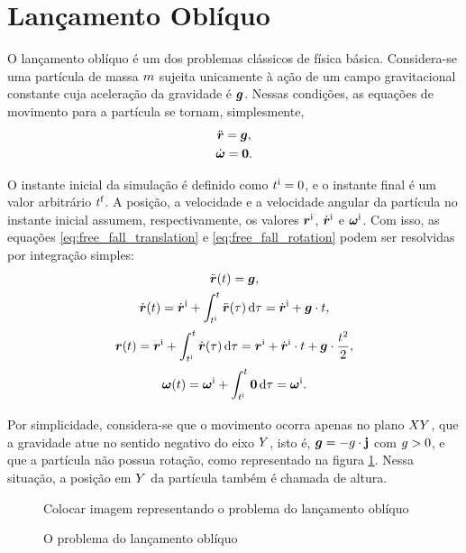 \section{Lançamento Oblíquo}

O lançamento oblíquo é um dos problemas clássicos de física básica. Considera-se uma partícula de massa \(m\) sujeita unicamente à ação de um campo gravitacional constante cuja aceleração da gravidade é \(\bm{g}\). Nessas condições, as equações de movimento para a partícula se tornam, simplesmente,
\begin{gather}
	\acceleration = \gravity, \label{eq:free_fall_translation}\\
	\angularAcceleration = \nullVector \label{eq:free_fall_rotation}.
\end{gather}

O instante inicial da simulação é definido como \(t_{}^{\text{i}}=0\), e o instante final é um valor arbitrário \(t_{}^{\text{f}}\). A posição, a velocidade e a velocidade angular da partícula no instante inicial assumem, respectivamente, os valores \(\bm{r}^{\text{i}}\), \(\initial{\velocity}\) e \(\bm{\omega}^{\text{i}}\). Com isso, as equações \eqref{eq:free_fall_translation} e \eqref{eq:free_fall_rotation} podem ser resolvidas por integração simples:
\begin{gather*}
	\acceleration\pqty{t} = \gravity, \\
	\velocity\pqty{t} = \initial{\velocity} + \int_{\initialInstant}^{t} \acceleration\pqty{\tau} \dd{\tau} = \initial{\velocity} + \gravity\cdot t, \\
	\position\pqty{t} = \initial{\position} + \int_{\initialInstant}^{t} \velocity\pqty{\tau} \dd{\tau} = \initial{\position} + \initial{\velocity}\cdot t + \gravity\cdot \dfrac{t^2}{2}, \\
	\angularVelocity\pqty{t} = \initial{\angularVelocity} + \int_{\initialInstant}^{t} \nullVector \dd{\tau} = \initial{\angularVelocity}.
\end{gather*}

Por simplicidade, considera-se que o movimento ocorra apenas no plano \(XY\), que a gravidade atue no sentido negativo do eixo \(Y\), isto é, \(\bm{g} = -g\cdot\mathbf{j}\) com \(g>0\), e que a partícula não possua rotação, como representado na figura \ref{fig:free_fall}. Nessa situação, a posição em \(Y\) da partícula também é chamada de altura.

\begin{figure}[h]
	\caption{O problema do lançamento oblíquo}
	\begin{center}
		\alert{Colocar imagem representando o problema do lançamento oblíquo}
	\end{center}
	\label{fig:free_fall}
\end{figure}

